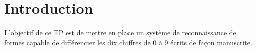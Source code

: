 \section{Introduction}

\paragraph{}
L'objectif de ce TP est de mettre en place un système de reconnaissance de formes capable de différencier les dix chiffres de 0 à 9 écrits de façon manuscrite. 

